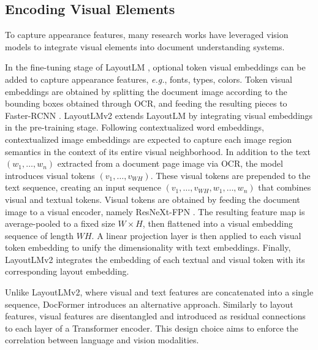 \subsection{Encoding Visual Elements} 

To capture appearance features, many research works have leveraged vision models to integrate visual elements into document understanding systems.


In the fine-tuning stage of LayoutLM \citep{xu2020layoutlm}, optional token visual embeddings can be added to capture appearance features, \textit{e.g.}, fonts, types, colors. Token visual embeddings are obtained by splitting the document image according to the bounding boxes obtained through \ac{OCR}, and feeding the resulting pieces to Faster-RCNN \citep{ren2015faster}. LayoutLMv2 \citep{xu2020layoutlmv2} extends LayoutLM by integrating visual embeddings in the pre-training stage. Following contextualized word embeddings, contextualized image embeddings are expected to capture each image region semantics in the context of its entire visual neighborhood. In addition to the text $(w_1, \ldots, w_n)$ extracted from a document page image via \ac{OCR}, the model introduces visual tokens $(v_1, \ldots, v_{WH})$. These visual tokens are prepended to the text sequence, creating an input sequence $(v_1, \ldots, v_{WH}, w_1, \ldots, w_n)$ that combines visual and textual tokens. Visual tokens are obtained by feeding the document image to a visual encoder, namely ResNeXt-FPN \citep{xie2017aggregated, lin2017feature}. The resulting feature map is average-pooled to a fixed size $W \times H$, then flattened into a visual embedding sequence of length $WH$. A linear projection layer is then applied to each visual token embedding to unify the dimensionality with text embeddings. Finally, LayoutLMv2 integrates the embedding of
each textual and visual token with its corresponding layout embedding. 

Unlike LayoutLMv2, where visual and text features are concatenated into a single sequence, DocFormer \citep{appalaraju2021docformer} introduces an alternative approach. Similarly to layout features, visual features are disentangled and introduced as residual connections to each layer of a Transformer encoder. This design choice aims to enforce the correlation between language and vision modalities. 

